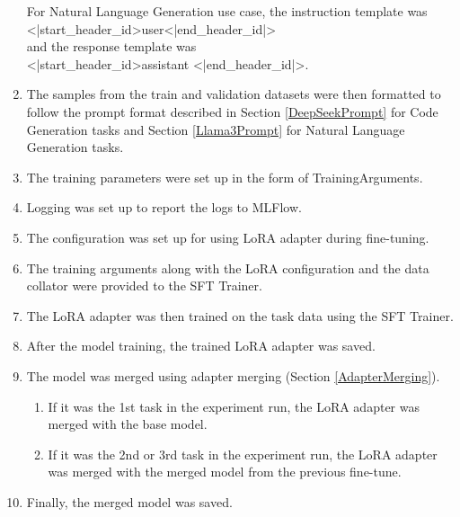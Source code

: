 \begin{enumerate}
For Natural Language Generation use case, the instruction template was\\
<|start\_header\_id>user<|end\_header\_id|> \\
and the response template was\\
<|start\_header\_id>assistant <|end\_header\_id|>.
\item The samples from the train and validation datasets were then formatted to follow the prompt format described in Section \ref{DeepSeekPrompt} for Code Generation tasks and Section \ref{Llama3Prompt} for Natural Language Generation tasks.
\item The training parameters were set up in the form of TrainingArguments. 
\item Logging was set up to report the logs to MLFlow.
\item The configuration was set up for using LoRA adapter during fine-tuning.
\item The training arguments along with the LoRA configuration and the data collator were provided to the SFT Trainer.
\item The LoRA adapter was then trained on the task data using the SFT Trainer.
\item After the model training, the trained LoRA adapter was saved.
\item The model was merged using adapter merging (Section \ref{AdapterMerging}).
\begin{enumerate}
\item If it was the 1st task in the experiment run, the LoRA adapter was merged with the base model.
\item If it was the 2nd or 3rd task in the experiment run, the LoRA adapter was merged with the merged model from the previous fine-tune.
\end{enumerate}
\item Finally, the merged model was saved. 
\end{enumerate}



